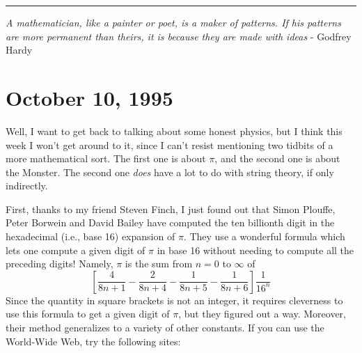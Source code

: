\documentclass{article}
\renewcommand{\texttt}[1]{%
  \begingroup
  \ttfamily
  \begingroup\lccode`~=`/\lowercase{\endgroup\def~}{/\discretionary{}{}{}}%
  \begingroup\lccode`~=`[\lowercase{\endgroup\def~}{[\discretionary{}{}{}}%
  \begingroup\lccode`~=`.\lowercase{\endgroup\def~}{.\discretionary{}{}{}}%
  \catcode`/=\active\catcode`[=\active\catcode`.=\active
  \scantokens{#1\noexpand}%
  \endgroup
}
\begin{document}
\begin{center}\rule{0.5\linewidth}{0.5pt}\end{center}

\emph{A mathematician, like a painter or poet, is a maker of patterns.
If his patterns are more permanent than theirs, it is because they are
made with ideas} - Godfrey Hardy



\hypertarget{week66}{%
\section{October 10, 1995}\label{week66}}

Well, I want to get back to talking about some honest physics, but I
think this week I won't get around to it, since I can't resist
mentioning two tidbits of a more mathematical sort. The first one is
about \(\pi\), and the second one is about the Monster. The second one
\emph{does} have a lot to do with string theory, if only indirectly.

First, thanks to my friend Steven Finch, I just found out that Simon
Plouffe, Peter Borwein and David Bailey have computed the ten billionth
digit in the hexadecimal (i.e., base 16) expansion of \(\pi\). They use
a wonderful formula which lets one compute a given digit of \(\pi\) in
base 16 without needing to compute all the preceding digits! Namely,
\(\pi\) is the sum from \(n = 0\) to \(\infty\) of \[
  \left[
    \frac{4}{8n+1} -\frac{2}{8n+4} -\frac{1}{8n+5} -\frac{1}{8n+6}
  \right] \frac{1}{16^n}
\] Since the quantity in square brackets is not an integer, it requires
cleverness to use this formula to get a given digit of \(\pi\), but they
figured out a way. Moreover, their method generalizes to a variety of
other constants. If you can use the World-Wide Web, try the following
sites:

\end{document}
